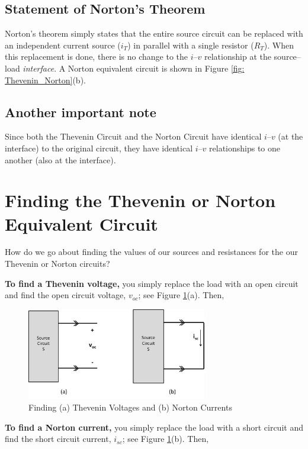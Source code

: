 \documentclass{handout}
\begin{document}
\subsection{Statement of Norton's Theorem}
Norton's theorem simply states that the entire source circuit can be replaced with an independent current source ($i_T$) in parallel with a single resistor ($R_T$).  When this replacement is done, there is no change to the $i$--$v$ relationship at the source--load {\em interface}.  A  Norton equivalent circuit is shown in Figure \ref{fig: Thevenin_Norton}(b).



\subsection{Another important note}
Since both the Thevenin Circuit and the Norton Circuit have identical $i$--$v$ (at the interface) to the original circuit, they have identical $i$--$v$ relationships to one another (also at the interface).

\section{Finding the Thevenin or Norton Equivalent Circuit}
How do we go about finding the values of our sources and resistances for the our Thevenin or Norton circuits?

\textbf{To find a Thevenin voltage,} you simply replace the load with an open circuit and find the open circuit voltage, $v_{oc}$; see Figure \ref{fig: v_oc_i_sc}(a). Then,
\begin{figure} [h t b]
\centering
\includegraphics[width=0.7\textwidth]{v_oc_i_sc.jpg}
\caption{Finding (a) Thevenin Voltages and (b) Norton Currents}
\label{fig: v_oc_i_sc}
\end{figure}

\textbf{To find a Norton current,} you simply replace the load with a short circuit and find the short circuit current, $i_{sc}$; see Figure \ref{fig: v_oc_i_sc}(b). Then,
\end{document}
